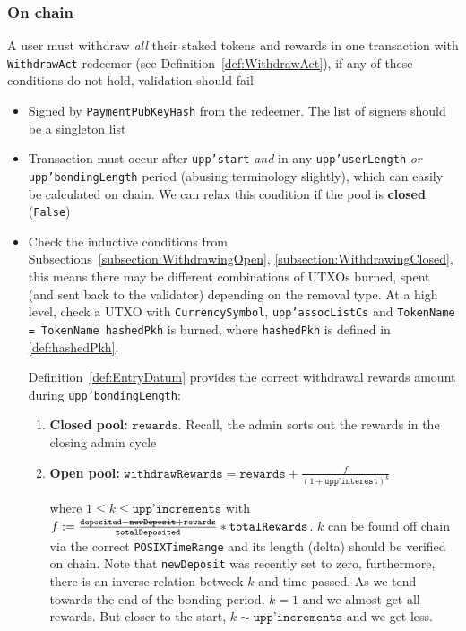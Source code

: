 \documentclass[10pt, a4paper]{article}
\theoremstyle{definition}
\begin{document}
\subsubsection{On chain}\label{subsection:UserWithdrawOnChain}
A user must withdraw \textit{all} their staked tokens and rewards in one transaction with \texttt{WithdrawAct} redeemer (see Definition~\ref{def:WithdrawAct}), if any of these conditions do not hold, validation should fail
\begin{itemize}
\item{Signed by \texttt{PaymentPubKeyHash} from the redeemer. The list of signers should be a singleton list}
\item{Transaction must occur after \texttt{upp'start} \textit{and} in any \texttt{upp'userLength} \textit{or} \texttt{upp'bondingLength} period (abusing terminology slightly), which can easily be calculated on chain. We can relax this condition if the pool is \textbf{closed} (\texttt{False})}
\item{Check the inductive conditions from Subsections~\ref{subsection:WithdrawingOpen}, \ref{subsection:WithdrawingClosed}, this means there may be different combinations of UTXOs burned, spent (and sent back to the validator) depending on the removal type. At a high level, check a UTXO with \texttt{CurrencySymbol}, \texttt{upp'assocListCs} and \texttt{TokenName = TokenName hashedPkh} is burned, where \texttt{hashedPkh} is defined in \ref{def:hashedPkh}. 

Definition~\ref{def:EntryDatum} provides the correct withdrawal rewards amount during \texttt{upp'bondingLength}:
\begin{enumerate}
\item{\textbf{Closed pool:}
 $\texttt{rewards}$.  Recall, the admin sorts out the rewards in the closing admin cycle}
\item{\textbf{Open pool:} $\texttt{withdrawRewards} = \texttt{rewards} + \frac{f}{(1 + \texttt{upp'interest})^k}$

 where $1 \leq k \leq \texttt{upp'increments}$ with $f := \frac{\texttt{deposited} - \st{\texttt{newDeposit}} + \texttt{rewards}}{\texttt{totalDeposited}} * \texttt{totalRewards}$. $k$ can be found off chain via the correct \texttt{POSIXTimeRange} and its length (delta) should be verified on chain. Note that \texttt{newDeposit} was recently set to zero, furthermore, there is an inverse relation betweek $k$ and time passed. As we tend towards the end of the bonding period, $k=1$ and we almost get all rewards. But closer to the start, $k \sim \texttt{upp'increments}$ and we get less.}
\end{enumerate}

}
\end{itemize}
\end{document}

